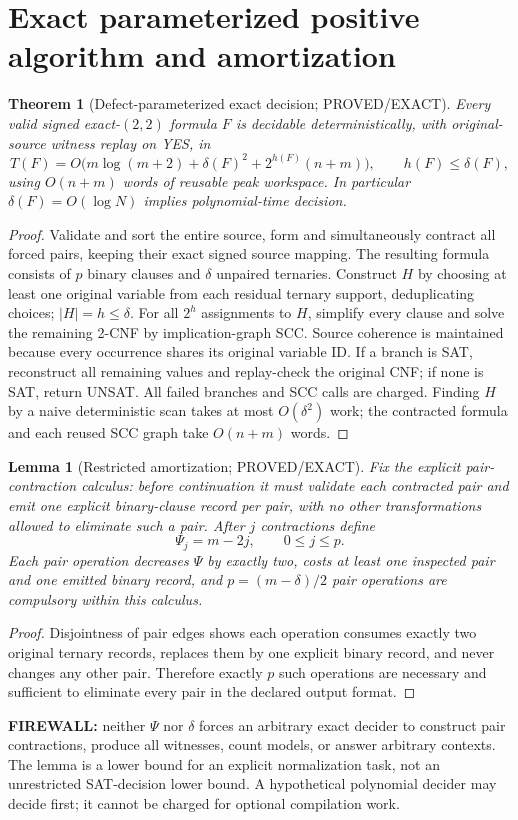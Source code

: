 \documentclass[11pt]{article}
\newtheorem{theorem}{Theorem}
\newtheorem{lemma}{Lemma}
\begin{document}
\section{Exact parameterized positive algorithm and amortization}
\begin{theorem}[Defect-parameterized exact decision; PROVED/EXACT]
Every valid signed exact-$(2,2)$ formula $F$ is decidable deterministically, with original-source witness replay on YES, in
\[
T(F)=O\bigl(m\log(m+2)+\delta(F)^2+2^{h(F)}(n+m)\bigr),\qquad
h(F)\le\delta(F),
\]
using $O(n+m)$ words of reusable peak workspace. In particular $\delta(F)=O(\log N)$ implies polynomial-time decision.
\end{theorem}
\begin{proof}
Validate and sort the entire source, form and simultaneously contract all forced pairs, keeping their exact signed source mapping. The resulting formula consists of $p$ binary clauses and $\delta$ unpaired ternaries. Construct $H$ by choosing at least one original variable from each residual ternary support, deduplicating choices; $|H|=h\le\delta$. For all $2^h$ assignments to $H$, simplify every clause and solve the remaining 2-CNF by implication-graph SCC. Source coherence is maintained because every occurrence shares its original variable ID. If a branch is SAT, reconstruct all remaining values and replay-check the original CNF; if none is SAT, return UNSAT. All failed branches and SCC calls are charged. Finding $H$ by a naive deterministic scan takes at most $O(\delta^2)$ work; the contracted formula and each reused SCC graph take $O(n+m)$ words.
\end{proof}
\begin{lemma}[Restricted amortization; PROVED/EXACT]
Fix the \emph{explicit pair-contraction calculus}: before continuation it must validate each contracted pair and emit one explicit binary-clause record per pair, with no other transformations allowed to eliminate such a pair. After $j$ contractions define
\[
\Psi_j=m-2j,\qquad 0\le j\le p.
\]
Each pair operation decreases $\Psi$ by exactly two, costs at least one inspected pair and one emitted binary record, and $p=(m-\delta)/2$ pair operations are compulsory \emph{within this calculus}.
\end{lemma}
\begin{proof}
Disjointness of pair edges shows each operation consumes exactly two original ternary records, replaces them by one explicit binary record, and never changes any other pair. Therefore exactly $p$ such operations are necessary and sufficient to eliminate every pair in the declared output format.
\end{proof}
\par\noindent\textbf{FIREWALL:} neither $\Psi$ nor $\delta$ forces an arbitrary exact decider to construct pair contractions, produce all witnesses, count models, or answer arbitrary contexts. The lemma is a lower bound for an explicit normalization task, not an unrestricted SAT-decision lower bound. A hypothetical polynomial decider may decide first; it cannot be charged for optional compilation work.
\end{document}
